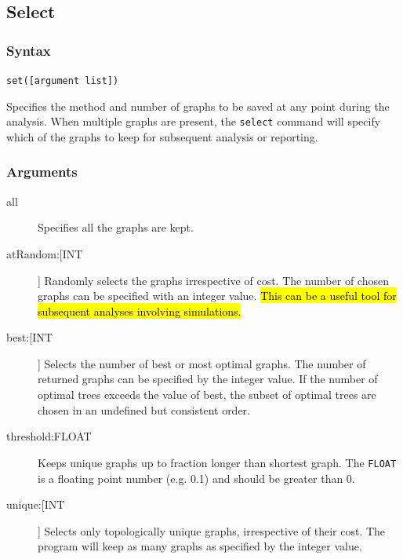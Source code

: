 \subsection{Select}
	\subsubsection{Syntax}
		\texttt{set([argument list])}
	
	\begin{phygdescription}
		{Specifies the method and number of graphs to be saved at any point during the 
		analysis. When multiple graphs are present, the \texttt{select} command will specify 
		which of the graphs to keep for subsequent analysis or reporting.}
	\end{phygdescription}
				
	\subsubsection{Arguments}
		\begin{description}
			\item[all] Specifies all the graphs are kept.
		
			\item[atRandom:[INT]] Randomly selects the graphs irrespective of cost. The 
			number of chosen graphs can be specified with an integer value. \hl{This can 
			be a useful tool for subsequent analyses involving simulations.}
			
			\item[best:[INT]] Selects the number of best or most optimal graphs. The 
			number of returned graphs can be specified by the integer value. If the number 
			of optimal trees exceeds the value of best, the subset of optimal trees are chosen 
			in an undefined but consistent order.
							
			\item[threshold:FLOAT] Keeps unique graphs up to fraction longer than shortest 
			graph. The \texttt{FLOAT} is a floating point number (e.g. 0.1) and should be 
			greater than 0.
			
			\item[unique:[INT]] Selects only topologically unique graphs, irrespective of their
			cost. The program will keep as many graphs as specified by the integer value.
		\end{description}

